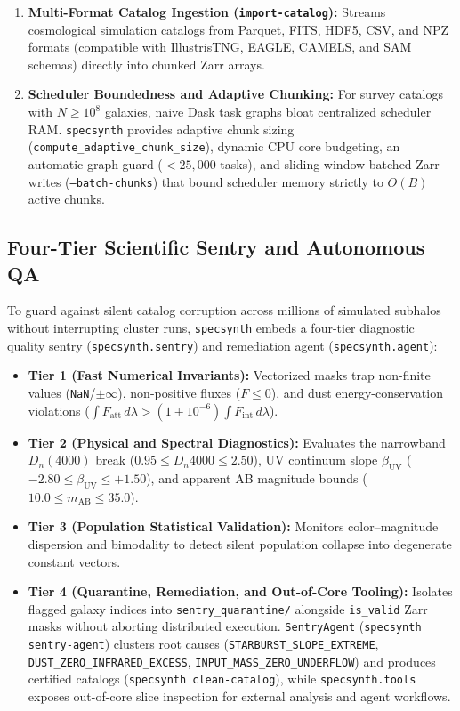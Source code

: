 \documentclass[preprint,12pt,authoryear]{elsarticle}
\begin{document}
\begin{enumerate}
\item \textbf{Multi-Format Catalog Ingestion (\texttt{import-catalog}):} Streams cosmological simulation catalogs from Parquet, FITS, HDF5, CSV, and NPZ formats (compatible with IllustrisTNG, EAGLE, CAMELS, and SAM schemas) directly into chunked Zarr arrays.
\item \textbf{Scheduler Boundedness and Adaptive Chunking:} For survey catalogs with $N \ge 10^8$ galaxies, naive Dask task graphs bloat centralized scheduler RAM. \texttt{specsynth} provides adaptive chunk sizing (\texttt{compute\_adaptive\_chunk\_size}), dynamic CPU core budgeting, an automatic graph guard ($<25{,}000$ tasks), and sliding-window batched Zarr writes (\texttt{--batch-chunks}) that bound scheduler memory strictly to $O(B)$ active chunks.
\end{enumerate}

\subsection{Four-Tier Scientific Sentry and Autonomous QA}
To guard against silent catalog corruption across millions of simulated subhalos without interrupting cluster runs, \texttt{specsynth} embeds a four-tier diagnostic quality sentry (\texttt{specsynth.sentry}) and remediation agent (\texttt{specsynth.agent}):
\begin{itemize}
\item \textbf{Tier 1 (Fast Numerical Invariants):} Vectorized masks trap non-finite values (\texttt{NaN}/$\pm\infty$), non-positive fluxes ($F \le 0$), and dust energy-conservation violations ($\int F_{\text{att}}\,d\lambda > (1+10^{-6})\int F_{\text{int}}\,d\lambda$).
\item \textbf{Tier 2 (Physical and Spectral Diagnostics):} Evaluates the narrowband $D_n(4000)$ break ($0.95 \le D_n4000 \le 2.50$), UV continuum slope $\beta_{\text{UV}}$ ($-2.80 \le \beta_{\text{UV}} \le +1.50$), and apparent AB magnitude bounds ($10.0 \le m_{\text{AB}} \le 35.0$).
\item \textbf{Tier 3 (Population Statistical Validation):} Monitors color--magnitude dispersion and bimodality to detect silent population collapse into degenerate constant vectors.
\item \textbf{Tier 4 (Quarantine, Remediation, and Out-of-Core Tooling):} Isolates flagged galaxy indices into \texttt{sentry\_quarantine/} alongside \texttt{is\_valid} Zarr masks without aborting distributed execution. \texttt{SentryAgent} (\texttt{specsynth sentry-agent}) clusters root causes (\texttt{STARBURST\_SLOPE\_EXTREME}, \texttt{DUST\_ZERO\_INFRARED\_EXCESS}, \texttt{INPUT\_MASS\_ZERO\_UNDERFLOW}) and produces certified catalogs (\texttt{specsynth clean-catalog}), while \texttt{specsynth.tools} exposes out-of-core slice inspection for external analysis and agent workflows.
\end{itemize}
\end{document}
